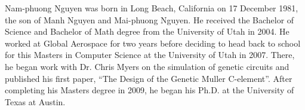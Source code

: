 \documentclass[12pt]{report}	%
\theoremstyle{definition}
\theoremstyle{remark}
\begin{document}
\begin{vita}
Nam-phuong Nguyen was born in Long Beach, California on 17 December 1981, the son of Manh Nguyen and Mai-phuong Nguyen.  He received the Bachelor of Science and Bachelor of Math degree from the University of Utah in 2004.  He worked at Global Aerospace for two years before deciding to head back to school for this Masters in Computer Science at the University of Utah in 2007.  There, he began work with Dr. Chris Myers on the simulation of genetic circuits and published his first paper, ``The Design of the Genetic Muller C-element''.  After completing his Masters degree in 2009, he began his Ph.D. at the University of Texas at Austin.  

\end{vita}
\end{document}
